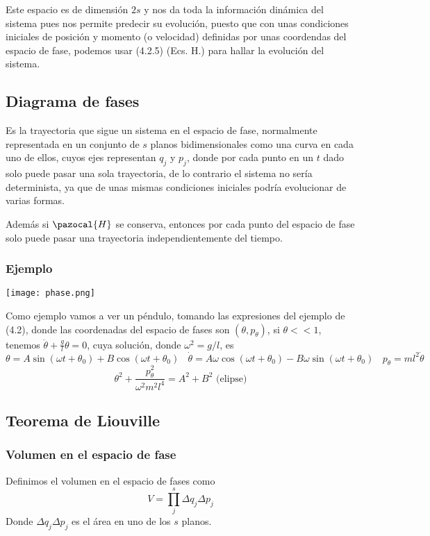 Este espacio es de dimensión $2s$ y nos da toda la información dinámica del sistema pues nos permite predecir su evolución, puesto que con unas condiciones iniciales de posición y momento (o velocidad) definidas por unas coordendas del espacio de fase, podemos usar (4.2.5) (Ecs. H.) para hallar la evolución del sistema.

\subsection{Diagrama de fases}
Es la trayectoria que sigue un sistema en el espacio de fase, normalmente representada en un conjunto de $s$ planos bidimensionales como una curva en cada uno de ellos, cuyos ejes representan $q_j$ y $p_j$, donde por cada punto en un $t$ dado solo puede pasar una sola trayectoria, de lo contrario el sistema no sería determinista, ya que de unas mismas condiciones iniciales podría evolucionar de varias formas.

Además si $\pazocal{H}$ se conserva, entonces por cada punto del espacio de fase solo puede pasar una trayectoria independientemente del tiempo.

\subsubsection{Ejemplo}
\begin{marginfigure}[0cm]
	\texttt{[image: phase.png]}
\end{marginfigure}
Como ejemplo vamos a ver un péndulo, tomando las expresiones del ejemplo de (4.2), donde las coordenadas del espacio de fases son $(\theta,p_\theta)$, si $\theta << 1$, tenemos $\ddot{\theta}+\frac{g}{l}\theta=0$, cuya solución, donde $\omega^2=g/l$, es
\[\theta = A \sin{(\omega t + \theta_0)}+ B \cos{(\omega t + \theta_0)} \ \ \ \ \dot{\theta} = A\omega \cos{(\omega t + \theta_0)}- B \omega \sin{(\omega t + \theta_0)} \ \ \ \ p_\theta = ml^2 \dot{\theta}\]
\[\theta^2 + \frac{p_\theta^2}{\omega^2 m^2l^4}=A^2+B^2 \mbox{ (elipse)}\]
\subsection{Teorema de Liouville} 
\subsubsection{Volumen en el espacio de fase}
Definimos el volumen en el espacio de fases como
\begin{equation} \label{4.3.1}
    V = \prod_j^s \Delta q_j \Delta p_j
\end{equation} 
Donde $\Delta q_j \Delta p_j$ es el área en uno de los $s$ planos.

